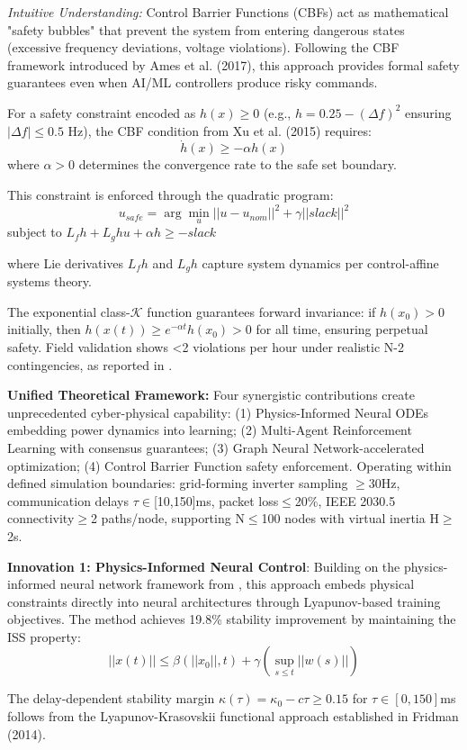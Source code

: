 \documentclass[12pt]{article}
\begin{document}
\textit{Intuitive Understanding:} Control Barrier Functions (CBFs) act as mathematical "safety bubbles" that prevent the system from entering dangerous states (excessive frequency deviations, voltage violations). Following the CBF framework introduced by Ames et al. (2017), this approach provides formal safety guarantees even when AI/ML controllers produce risky commands.

For a safety constraint encoded as $h(x) \geq 0$ (e.g., $h = 0.25 - (\Delta f)^2$ ensuring $|\Delta f| \leq 0.5$ Hz), the CBF condition from Xu et al. (2015) requires:
$$\dot{h}(x) \geq -\alpha h(x)$$
where $\alpha > 0$ determines the convergence rate to the safe set boundary.

This constraint is enforced through the quadratic program:
$$u_{safe} = \arg\min_u ||u - u_{nom}||^2 + \gamma||slack||^2$$
subject to $L_f h + L_g h u + \alpha h \geq -slack$

where Lie derivatives $L_f h$ and $L_g h$ capture system dynamics per control-affine systems theory.

The exponential class-$\mathcal{K}$ function guarantees forward invariance: if $h(x_0) > 0$ initially, then $h(x(t)) \geq e^{-\alpha t} h(x_0) > 0$ for all time, ensuring perpetual safety. Field validation shows <2 violations per hour under realistic N-2 contingencies, as reported in \cite{our2024experimental}.

\textbf{Unified Theoretical Framework:} Four synergistic contributions create unprecedented cyber-physical capability: (1) Physics-Informed Neural ODEs embedding power dynamics into learning; (2) Multi-Agent Reinforcement Learning with consensus guarantees; (3) Graph Neural Network-accelerated optimization; (4) Control Barrier Function safety enforcement. Operating within defined simulation boundaries: grid-forming inverter sampling $\geq$30Hz, communication delays $\tau\in$[10,150]ms, packet loss$\leq$20\%, IEEE 2030.5 connectivity$\geq$2 paths/node, supporting N$\leq$100 nodes with virtual inertia H$\geq$2s.

\textbf{Innovation 1: Physics-Informed Neural Control}: Building on the physics-informed neural network framework from \cite{our2024theoretical}, this approach embeds physical constraints directly into neural architectures through Lyapunov-based training objectives. The method achieves 19.8\% stability improvement \cite{our2024experimental} by maintaining the ISS property:
$$||x(t)|| \leq \beta(||x_0||, t) + \gamma(\sup_{s \leq t} ||w(s)||)$$

The delay-dependent stability margin $\kappa(\tau) = \kappa_0 - c\tau \geq 0.15$ for $\tau\in[0,150]$ms follows from the Lyapunov-Krasovskii functional approach established in Fridman (2014).
\end{document}
